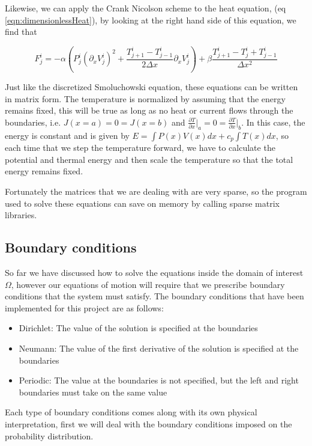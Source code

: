 Likewise, we can apply the Crank Nicolson scheme to the heat equation, (eq \ref{eqn:dimensionlessHeat}), by looking at the right hand side of this equation, we find that

\begin{equation}
F_j^i = -\alpha \left (P_j^i (\partial_x V_j^i)^2 + \frac{T_{j+1}^i - T_{j-1}^i }{2 \Delta x}\partial_x V_j^i  \right) + \beta \frac{T_{j+1}^i - T_j^i + T_{j-1}^i}{\Delta x^2}
\end{equation}

Just like the discretized Smoluchowski equation, these equations can be written in matrix form. The temperature is normalized by assuming that the energy remains fixed, this will be true as long as no heat or current flows through the boundaries, i.e. $J(x=a) = 0 = J(x = b)$ and $\frac{\partial T}{\partial x} \rvert_a = 0 = \frac{\partial T}{\partial x} \rvert_b$. In this case, the energy is constant and is given by $E = \int P(x) V(x) dx + c_p \int T(x) dx$, so each time that we step the temperature forward, we have to calculate the potential and thermal energy and then scale the temperature so that the total energy remains fixed.

Fortunately the matrices that we are dealing with are very sparse, so the program used to solve these equations can save on memory by calling sparse matrix libraries.

\subsection{Boundary conditions}
So far we have discussed how to solve the equations inside the domain of interest $\Omega$, however our equations of motion will require that we prescribe boundary conditions that the system must satisfy. The boundary conditions that have been implemented for this project are as follows:

\begin{itemize}
\item{Dirichlet: The value of the solution is specified at the boundaries}
\item{Neumann: The value of the first derivative of the solution is specified at the boundaries}
\item{Periodic: The value at the boundaries is not specified, but the left and right boundaries must take on the same value}
\end{itemize}
Each type of boundary conditions comes along with its own physical interpretation, first we will deal with the boundary conditions imposed on the probability distribution.

